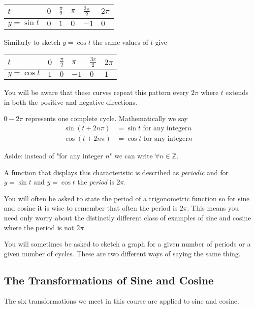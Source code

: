 \begin{tabular}[c]{|l|l|l|l|l|l|}\hline
	$t$  & $0$  & $\frac{\pi }{2}$  & $\pi $  & $\frac{3 \pi }{2}$  & $2 \pi $  \\
	\hline
	$y =\sin  t$  & $0$  & $1$  & $0$  & $ -1$  & $0$  \\
	\hline
\end{tabular}

Similarly to sketch $y =\cos  t$ the same values of $t$ give 


\begin{tabular}[c]{|l|l|l|l|l|l|}\hline
	$t$  & $0$  & $\frac{\pi }{2}$  & $\pi $  & $\frac{3 \pi }{2}$  & $2 \pi $  \\
	\hline
	$y =\cos  t$  & $1$  & $0$  & $ -1$  & $0$  & $1$  \\
	\hline
\end{tabular}

You will be aware that these curves repeat this pattern every $2 \pi $ where $t$ extends in both the positive and negative directions. 

$0 -2 \pi $ represents one complete cycle. Mathematically we say
\begin{align*}\sin  \left (t +2 n \pi \right ) &  = \sin  t\text{\  for any integer}n \\
	\cos  \left (t +2 n \pi \right ) &  = \cos  t\text{\  for any integer}n\end{align*}

Aside: instead of "for any integer $n$" we can write $ \forall n \in \mathbb{Z}$. 

A function that displays this characteristic is described as \emph{periodic} and for $y =\sin  t$ and $y =\cos  t$ the \emph{period} is $2 \pi $. 

You will often be asked to state the period of a trigonometric function so for sine and cosine it
is wise to remember that often the period is $2 \pi $. This means you need only worry about the distinctly different class of examples
of sine and cosine where the period is not $2 \pi $. 

You will sometimes be asked to sketch a graph for a given number of periods or a given number of cycles. These are two different ways of saying the same thing. 

\subsection{The Transformations of Sine and Cosine}
The six transformations we meet in this course are applied to sine and cosine. 

